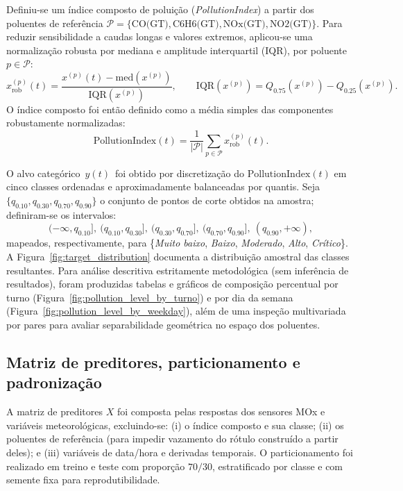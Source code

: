 Definiu-se um índice composto de poluição (\textit{PollutionIndex}) a partir dos poluentes de referência \(\mathcal{P}=\{\text{CO(GT)},\text{C6H6(GT)},\text{NOx(GT)},\text{NO2(GT)}\}\). Para reduzir sensibilidade a caudas longas e valores extremos, aplicou-se uma normalização robusta por mediana e amplitude interquartil (IQR), por poluente \(p\in\mathcal{P}\):
\begin{equation}
x^{(p)}_{\mathrm{rob}}(t)=\frac{x^{(p)}(t)-\mathrm{med}\!\left(x^{(p)}\right)}{\mathrm{IQR}\!\left(x^{(p)}\right)},
\qquad
\mathrm{IQR}\!\left(x^{(p)}\right)=Q_{0.75}\!\left(x^{(p)}\right)-Q_{0.25}\!\left(x^{(p)}\right).
\label{eq:robust_norm}
\end{equation}
O índice composto foi então definido como a média simples das componentes robustamente normalizadas:
\begin{equation}
\mathrm{PollutionIndex}(t)=\frac{1}{|\mathcal{P}|}\sum_{p\in\mathcal{P}}x^{(p)}_{\mathrm{rob}}(t).
\label{eq:pollution_index}
\end{equation}

O alvo categórico \(\,y(t)\,\) foi obtido por discretização do \(\mathrm{PollutionIndex}(t)\) em cinco classes ordenadas e aproximadamente balanceadas por quantis. Seja \(\{q_{0.10},q_{0.30},q_{0.70},q_{0.90}\}\) o conjunto de pontos de corte obtidos na amostra; definiram-se os intervalos:
\begin{equation}
(-\infty,q_{0.10}],\ (q_{0.10},q_{0.30}],\ (q_{0.30},q_{0.70}],\ (q_{0.70},q_{0.90}],\ (q_{0.90},+\infty),
\label{eq:quantile_bins}
\end{equation}
mapeados, respectivamente, para \{\textit{Muito baixo}, \textit{Baixo}, \textit{Moderado}, \textit{Alto}, \textit{Crítico}\}. A Figura~\ref{fig:target_distribution} documenta a distribuição amostral das classes resultantes. Para análise descritiva estritamente metodológica (sem inferência de resultados), foram produzidas tabelas e gráficos de composição percentual por turno (Figura~\ref{fig:pollution_level_by_turno}) e por dia da semana (Figura~\ref{fig:pollution_level_by_weekday}), além de uma inspeção multivariada por pares para avaliar separabilidade geométrica no espaço dos poluentes.

\subsection{Matriz de preditores, particionamento e padronização}
\label{subsec:split_scaling}

A matriz de preditores \(X\) foi composta pelas respostas dos sensores MOx e variáveis meteorológicas, excluindo-se: (i) o índice composto e sua classe; (ii) os poluentes de referência (para impedir vazamento do rótulo construído a partir deles); e (iii) variáveis de data/hora e derivadas temporais. O particionamento foi realizado em treino e teste com proporção \(70/30\), estratificado por classe e com semente fixa para reprodutibilidade.

